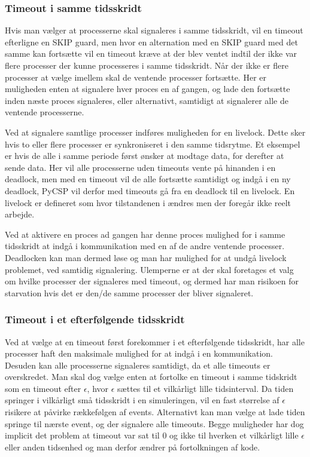 \subsubsection{Timeout i samme tidsskridt} Hvis man vælger at
processerne skal signaleres i samme tidsskridt, vil en timeout
efterligne en SKIP guard, men hvor en alternation med en SKIP guard med
det samme kan fortsætte vil en timeout kræve at der blev ventet indtil
der ikke var flere processer der kunne processeres i samme tidsskridt.
Når der ikke er flere processer at vælge imellem skal de ventende
processer fortsætte. Her er muligheden enten at signalere hver proces
en af gangen, og lade den fortsætte inden næste proces signaleres,
eller alternativt, samtidigt at signalerer alle de ventende processerne.

Ved at signalere samtlige processer indføres muligheden for en
livelock. Dette sker hvis to eller flere processer er synkroniseret i
den samme tidsrytme. Et eksempel er hvis de alle i samme periode først
ønsker at modtage data, for derefter at sende data. Her vil alle
processerne uden timeouts vente på hinanden i en deadlock, men med en
timeout vil de alle fortsætte samtidigt og indgå i en ny deadlock,
PyCSP vil derfor med timeouts gå fra en deadlock til en livelock. En
livelock er defineret som hvor tilstandenen i ændres men der foregår
ikke reelt arbejde.

Ved at aktivere en proces ad gangen har denne proces mulighed for i
samme tidsskridt at indgå i kommunikation med en af de andre ventende
processer. Deadlocken kan man dermed løse og man har mulighed for at
undgå livelock problemet, ved samtidig signalering. Ulemperne er at der
skal foretages et valg om hvilke processer der signaleres med timeout,
og dermed har man risikoen for starvation hvis det er
den/de samme processer der bliver signaleret.

\subsubsection{Timeout i et efterfølgende tidsskridt} Ved at vælge at
en timeout først forekommer i et efterfølgende tidsskridt, har alle
processer haft den maksimale mulighed for at indgå i en kommunikation.
Desuden kan alle processerne signaleres samtidigt, da et alle timeouts
er overskredet. Man skal dog vælge enten at fortolke en timeout i samme
tidskridt som en timeout efter $\epsilon$, hvor $\epsilon$ sættes til
et vilkårligt lille tidsinterval. Da tiden springer i vilkårligt små
tidsskridt i en simuleringen, vil en fast størrelse af $\epsilon$
risikere at påvirke rækkefølgen af events. Alternativt kan man vælge
at lade tiden springe til nærste event, og der signalere alle timeouts.
Begge muligheder har dog implicit det problem at timeout var sat til
0 og ikke til hverken et vilkårligt lille $\epsilon$ eller anden
tidsenhed og man derfor ændrer på fortolkningen af kode.

